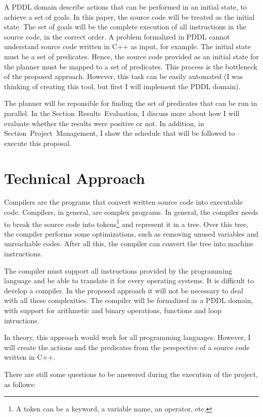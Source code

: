 \documentclass[letterpaper]{article}
\begin{document}
A PDDL domain describe actions that can be performed in an initial state, to achieve a set of goals. In this paper, the source code will be treated as the initial state. The set of goals will be the complete execution of all instructions in the source code, in the correct order. A problem formalized in PDDL cannot understand source code written in C++ as input, for example. The initial state must be a set of predicates. Hence, the source code provided as an initial state for the planner must be mapped to a set of predicates. This process is the bottleneck of the proposed approach. However, this task can be easily automated (I was thinking of creating this tool, but first I will implement the PDDL domain).

The planner will be reponsible for finding the set of predicates that can be run in parallel. In the Section~Results~Evaluation, I discuss more about how I will evaluate whether the results were positive or not. In addition, in Section~Project~Management, I show the schedule that will be followed to execute this proposal.


\section{Technical Approach}

Compilers are the programs that convert written source code into executable code. Compilers, in general, are complex programs. In general, the compiler needs to break the source code into tokens\footnote{A token can be a keyword, a variable name, an operator, etc.} and represent it in a tree. Over this tree, the compiler performs some optimizations, such as removing unused variables and unreachable codes. After all this, the compiler can convert the tree into machine instructions.

The compiler must support all instructions provided by the programming language and be able to translate it for every operating systems. It is difficult to develop a compiler. In the proposed approach it will not be necessary to deal with all these complexities. The compiler will be formalized as a PDDL domain, with support for arithmetic and binary operations, functions and loop intructions.

In theory, this approach would work for all programming languages. However, I will create the actions and the predicates from the perspective of a source code written in C++.

There are still some questions to be answered during the execution of the project, as follows:
\end{document}
